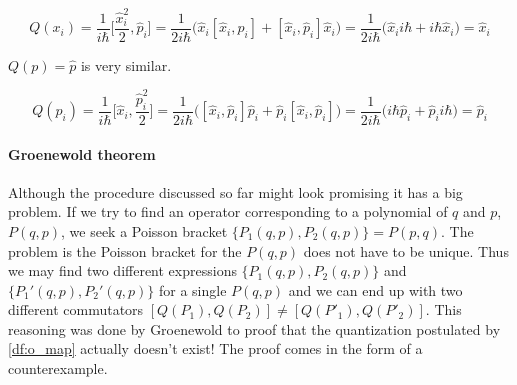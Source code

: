 \begin{equation*}
    Q(x_{i}) = \frac{1}{i \hbar}\bigg[\frac{\hat{x}_{i}^{2}}{2}, \hat{p}_{i}\bigg] = 
    \frac{1}{2 i \hbar} \big(\hat{x}_{i} [\hat{x}_{i}, \hat{p}_{i}] + [\hat{x}_{i}, \hat{p}_{i}] \hat{x}_{i}\big) =
    \frac{1}{2 i \hbar} \big(\hat{x}_{i} i \hbar + i \hbar \hat{x}_{i}\big) = \hat{x}_{i}
\end{equation*}

 $Q(p) = \hat{p}$ is very similar.

\begin{equation*}
    Q(p_{i}) = \frac{1}{i \hbar}\bigg[\hat{x}_{i}, \frac{\hat{p}_{i}^{2}}{2}\bigg] = 
    \frac{1}{2 i \hbar} \big([\hat{x}_{i}, \hat{p}_{i}] \hat{p}_{i} + \hat{p}_{i} [\hat{x}_{i}, \hat{p}_{i}]\big) =
    \frac{1}{2 i \hbar} \big(i \hbar \hat{p}_{i} + \hat{p}_{i} i \hbar \big) = \hat{p}_{i}
\end{equation*}

\paragraph{Groenewold theorem} Although the procedure discussed so far might look promising it has a big problem.
If we try to find an operator corresponding to a polynomial of $q$ and $p$, $P(q, p)$, we seek a Poisson
bracket $\{P_{1}(q, p), P_{2}(q, p)\} = P(p, q)$. The problem is the Poisson bracket for the $P(q, p)$ does
not have to be unique. Thus we may find two different expressions $\{P_{1}(q, p), P_{2}(q, p)\}$ and $\{P_{1}'(q, p), P_{2}'(q, p)\}$
for a single $P(q, p)$ and we can end up with two different commutators $[Q(P_{1}), Q(P_{2})] \neq [Q(P'_{1}), Q(P'_{2})]$.
This reasoning was done by Groenewold to proof that the quantization postulated by \ref{df:o_map} actually doesn't
exist! The proof comes in the form of a counterexample.

